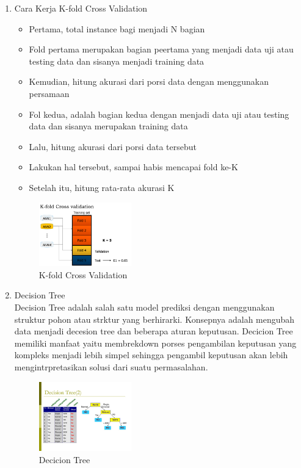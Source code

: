 \begin{enumerate}
\item Cara Kerja K-fold Cross Validation 
\begin{itemize}
\item Pertama, total instance bagi menjadi N bagian
\item Fold pertama merupakan bagian peertama yang menjadi data uji atau testing data dan sisanya menjadi training data
\item Kemudian, hitung akurasi dari porsi data dengan menggunakan persamaan
\item Fol kedua, adalah bagian kedua dengan menjadi data uji atau testing data dan sisanya merupakan training data
\item Lalu, hitung akurasi dari porsi data tersebut
\item Lakukan hal tersebut, sampai habis mencapai fold ke-K
\item Setelah itu, hitung rata-rata akurasi K
\end{itemize}
\begin{figure}[H]
		\includegraphics[width=4cm]{figures/1174073/2/kfold.png}
		\centering
		\caption{K-fold Cross Validation}
\end{figure}

\item Decision Tree \\
Decision Tree adalah salah satu model prediksi dengan menggunakan struktur pohon atau strktur yang berhirarki. Konsepnya adalah mengubah data menjadi decesion tree dan beberapa aturan keputusan. Decicion Tree memiliki manfaat yaitu membrekdown porses pengambilan keputusan yang kompleks menjadi lebih simpel sehingga pengambil keputusan akan lebih mengintrpretasikan solusi dari suatu permasalahan.
\begin{figure}[H]
		\includegraphics[width=4cm]{figures/1174073/2/decision.jpg}
		\centering
		\caption{Decicion Tree}
\end{figure}


\end{enumerate}
